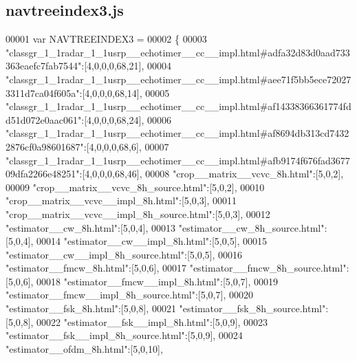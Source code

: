 \subsection{navtreeindex3.\+js}
\label{navtreeindex3_8js_source}

\begin{DoxyCode}
00001 var NAVTREEINDEX3 =
00002 \{
00003 \textcolor{stringliteral}{"classgr\_1\_1radar\_1\_1usrp\_\_echotimer\_\_cc\_\_impl.html#adfa32d83d0aad733363eaefc7fab7544"}:[4,0,0,0,68,21],
00004 \textcolor{stringliteral}{"classgr\_1\_1radar\_1\_1usrp\_\_echotimer\_\_cc\_\_impl.html#aee71f5bb5ece720273311d7ca04f605a"}:[4,0,0,0,68,14],
00005 \textcolor{stringliteral}{"classgr\_1\_1radar\_1\_1usrp\_\_echotimer\_\_cc\_\_impl.html#af14338366361774fdd51d072e0aac061"}:[4,0,0,0,68,24],
00006 \textcolor{stringliteral}{"classgr\_1\_1radar\_1\_1usrp\_\_echotimer\_\_cc\_\_impl.html#af8694db313cd74322876cf0a98601687"}:[4,0,0,0,68,6],
00007 \textcolor{stringliteral}{"classgr\_1\_1radar\_1\_1usrp\_\_echotimer\_\_cc\_\_impl.html#afb9174f676fad367709dfa2266e48251"}:[4,0,0,0,68,46],
00008 \textcolor{stringliteral}{"crop\_\_matrix\_\_vcvc\_8h.html"}:[5,0,2],
00009 \textcolor{stringliteral}{"crop\_\_matrix\_\_vcvc\_8h\_source.html"}:[5,0,2],
00010 \textcolor{stringliteral}{"crop\_\_matrix\_\_vcvc\_\_impl\_8h.html"}:[5,0,3],
00011 \textcolor{stringliteral}{"crop\_\_matrix\_\_vcvc\_\_impl\_8h\_source.html"}:[5,0,3],
00012 \textcolor{stringliteral}{"estimator\_\_cw\_8h.html"}:[5,0,4],
00013 \textcolor{stringliteral}{"estimator\_\_cw\_8h\_source.html"}:[5,0,4],
00014 \textcolor{stringliteral}{"estimator\_\_cw\_\_impl\_8h.html"}:[5,0,5],
00015 \textcolor{stringliteral}{"estimator\_\_cw\_\_impl\_8h\_source.html"}:[5,0,5],
00016 \textcolor{stringliteral}{"estimator\_\_fmcw\_8h.html"}:[5,0,6],
00017 \textcolor{stringliteral}{"estimator\_\_fmcw\_8h\_source.html"}:[5,0,6],
00018 \textcolor{stringliteral}{"estimator\_\_fmcw\_\_impl\_8h.html"}:[5,0,7],
00019 \textcolor{stringliteral}{"estimator\_\_fmcw\_\_impl\_8h\_source.html"}:[5,0,7],
00020 \textcolor{stringliteral}{"estimator\_\_fsk\_8h.html"}:[5,0,8],
00021 \textcolor{stringliteral}{"estimator\_\_fsk\_8h\_source.html"}:[5,0,8],
00022 \textcolor{stringliteral}{"estimator\_\_fsk\_\_impl\_8h.html"}:[5,0,9],
00023 \textcolor{stringliteral}{"estimator\_\_fsk\_\_impl\_8h\_source.html"}:[5,0,9],
00024 \textcolor{stringliteral}{"estimator\_\_ofdm\_8h.html"}:[5,0,10],

\end{DoxyCode}
